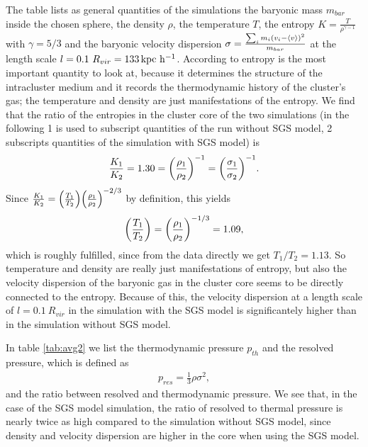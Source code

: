 The table lists as general quantities of the simulations the baryonic mass
$m_{bar}$ inside the chosen sphere, the density $\rho$, the temperature $T$, the
entropy $K=\frac{T}{\rho^{\gamma-1}}$ with $\gamma=5/3$ and the baryonic
velocity dispersion $\sigma= \frac{\sum_i m_i { \left( v_i -
\langle v \rangle \right) }^2}{m_{bar}}$ at the length scale 
$l=0.1\ R_{vir}=\unit[133]{kpc\ h^{-1}}$. According to \citet{Voit2005} entropy
is the most important quantity to look at, because it determines
the structure of the intracluster medium and it records the thermodynamic
history of the cluster's gas; the temperature and density are just
manifestations of the entropy.
We find that the ratio of the entropies in the cluster core of the two
simulations (in the 
following 1 is used to subscript quantities of the run without SGS model, 2
subscripts quantities of the simulation with SGS model) is
\begin{align}
\frac{K_1}{K_2}=1.30 = { \left( \frac{\rho_1}{\rho_2} \right) }^{-1}=
{ \left( \frac{\sigma_1}{\sigma_2} \right) }^{-1}.
\end{align}
Since $\frac{K_1}{K_2}=
{ \left( \frac{T_1}{T_2} \right) }{ \left( \frac{\rho_1}{\rho_2} \right) }^{-2/3}$ by definition, this
yields
\begin{align}
{ \left( \frac{T_1}{T_2} \right) }={ \left( \frac{\rho_1}{\rho_2} \right) }^{-1/3}=1.09,
\end{align}
which is roughly fulfilled, since from the data directly
we get $T_1/T_2 = 1.13$. So temperature and density are really just
manifestations of entropy, but also the velocity dispersion of the baryonic
gas in the cluster core seems to be directly connected to the entropy.
Because of this, the velocity dispersion at a length scale of $l=0.1\ R_{vir}$
in
the simulation with the SGS model is significantely higher than in the
simulation without SGS model.

In table \ref{tab:avg2} we list the thermodynamic pressure $p_{th}$ and the
resolved pressure, which is defined as
\begin{align}
p_{res}=\frac{1}{3} \rho \sigma^2,
\end{align}
and the ratio between resolved and thermodynamic pressure. We see that, in 
the case of the SGS model simulation, the ratio of resolved to thermal pressure
is nearly twice as high compared to the simulation without SGS model, since
density and velocity dispersion are higher in the core when using the SGS
model.

